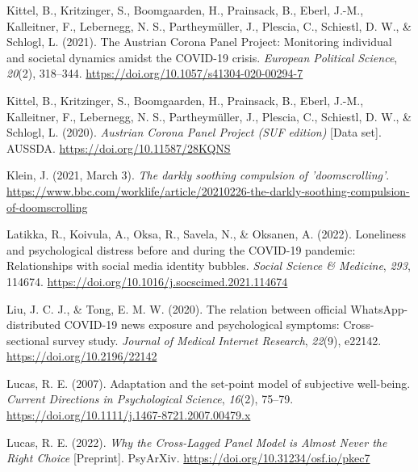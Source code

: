 \documentclass[
  man,mask,floatsintext]{apa7}
\newlength{\cslhangindent}
\newlength{\cslentryspacingunit} %
\newenvironment{CSLReferences}[2] %
 {%
  \setlength{\parindent}{0pt}
  \ifodd #1
  \let\oldpar\par
  \def\par{\hangindent=\cslhangindent\oldpar}
  \fi
  \setlength{\parskip}{#2\cslentryspacingunit}
 }%
 {}
\begin{document}
\begin{CSLReferences}{1}{0}
\leavevmode{}%
Kittel, B., Kritzinger, S., Boomgaarden, H., Prainsack, B., Eberl, J.-M., Kalleitner, F., Lebernegg, N. S., Partheymüller, J., Plescia, C., Schiestl, D. W., \& Schlogl, L. (2021). The {Austrian Corona Panel Project}: Monitoring individual and societal dynamics amidst the {COVID-19} crisis. \emph{European Political Science}, \emph{20}(2), 318--344. \url{https://doi.org/10.1057/s41304-020-00294-7}

\leavevmode{}%
Kittel, B., Kritzinger, S., Boomgaarden, H., Prainsack, B., Eberl, J.-M., Kalleitner, F., Lebernegg, N. S., Partheymüller, J., Plescia, C., Schiestl, D. W., \& Schlogl, L. (2020). \emph{Austrian {Corona Panel Project} ({SUF} edition)} {[}Data set{]}. {AUSSDA}. \url{https://doi.org/10.11587/28KQNS}

\leavevmode{}%
Klein, J. (2021, March 3). \emph{The darkly soothing compulsion of 'doomscrolling'}. \url{https://www.bbc.com/worklife/article/20210226-the-darkly-soothing-compulsion-of-doomscrolling}

\leavevmode{}%
Latikka, R., Koivula, A., Oksa, R., Savela, N., \& Oksanen, A. (2022). Loneliness and psychological distress before and during the {COVID-19} pandemic: {Relationships} with social media identity bubbles. \emph{Social Science \& Medicine}, \emph{293}, 114674. \url{https://doi.org/10.1016/j.socscimed.2021.114674}

\leavevmode{}%
Liu, J. C. J., \& Tong, E. M. W. (2020). The relation between official {WhatsApp-distributed COVID-19} news exposure and psychological symptoms: Cross-sectional survey study. \emph{Journal of Medical Internet Research}, \emph{22}(9), e22142. \url{https://doi.org/10.2196/22142}

\leavevmode{}%
Lucas, R. E. (2007). Adaptation and the set-point model of subjective well-being. \emph{Current Directions in Psychological Science}, \emph{16}(2), 75--79. \url{https://doi.org/10.1111/j.1467-8721.2007.00479.x}

\leavevmode{}%
Lucas, R. E. (2022). \emph{Why the {Cross-Lagged Panel Model} is {Almost Never} the {Right Choice}} {[}Preprint{]}. {PsyArXiv}. \url{https://doi.org/10.31234/osf.io/pkec7}


\end{CSLReferences}
\end{document}
